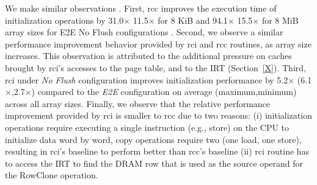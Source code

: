 We make similar observations . 
First, rcc improves the execution time of initialization operations by 31.0$\times{}$ \textendash{} 11.5$\times{}$ for 8 KiB and 94.1$\times{}$ \textendash{} 15.5$\times{}$ for 8 MiB array sizes for E2E \textendash{} No Flush configurations . 
Second, we observe a similar performance improvement behavior provided by rci and rcc routines, as array size increases. This observation is attributed to the additional pressure on caches brought by rci's accesses to the page table, and to the IRT (Section~\ref{X}). 
Third, rci under \emph{No Flush} configuration improves initialization performance by 5.2$\times{}$ (6.1$\times{}$,2.7$\times{}$) compared to the \emph{E2E} configuration on average (maximum,minimum) across all array sizes. 
Finally, we observe that the relative performance improvement provided by rci is smaller to rcc due to two reasons: (i) initialization operations require executing a single instruction (e.g., store) on the CPU to initialize data word by word, copy operations require two (one load, one store), resulting in rci's baseline to perform better than rcc's baseline (ii) rci routine has to access the IRT to find the DRAM row that is used as the source operand for the RowClone operation.
\fi




\iffalse
\begin{figure}[!ht]
  \centering
  \texttt{[image: figures/system-flush-overhead.pdf]}
  \caption{\todo{Change vert. axis label} Degradation in execution time introduced by system support and CLFLUSH instructions for RowClone. Baseline is in-DRAM copy. Y-axis shows the degradation in performance (increase in execution time) proportional to the baseline, X-axis shows the array sizes ranging from 8 KBs to 8 MBs.}
  \label{fig:system-xxxxxxxx}
\end{figure}
\fi


